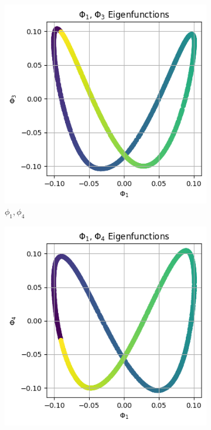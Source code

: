 \begin{figure}[H]
    \begin{subfigure}{.25\textwidth}
        \includegraphics[width=\linewidth]{images/ex3_task2_part3_2D_4.png}
        \caption{$\phi_1, \phi_4$}
    \end{subfigure}%
    \begin{subfigure}{.25\textwidth}
        \includegraphics[width=\linewidth]{images/ex3_task2_part3_2D_5.png}

\end{subfigure}
\end{figure}
